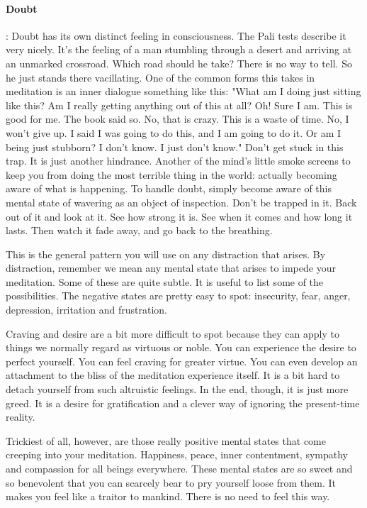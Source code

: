 \paragraph*{Doubt}: Doubt has its own distinct feeling in consciousness. The Pali tests
describe it very nicely. It's the feeling of a man stumbling through a desert
and arriving at an unmarked crossroad. Which road should he take? There is no
way to tell. So he just stands there vacillating. One of the common forms this
takes in meditation is an inner dialogue something like this: "What am I doing
just sitting like this? Am I really getting anything out of this at all? Oh!
Sure I am. This is good for me. The book said so. No, that is crazy. This is a
waste of time. No, I won't give up. I said I was going to do this, and I am
going to do it. Or am I being just stubborn? I don't know. I just don't know."
Don't get stuck in this trap. It is just another hindrance. Another of the
mind's little smoke screens to keep you from doing the most terrible thing in
the world: actually becoming aware of what is happening. To handle doubt, simply
become aware of this mental state of wavering as an object of inspection. Don't
be trapped in it. Back out of it and look at it. See how strong it is. See when
it comes and how long it lasts. Then watch it fade away, and go back to the
breathing.

This is the general pattern you will use on any distraction that arises. By
distraction, remember we mean any mental state that arises to impede your
meditation. Some of these are quite subtle. It is useful to list some of the
possibilities. The negative states are pretty easy to spot: insecurity, fear,
anger, depression, irritation and frustration.

Craving and desire are a bit more difficult to spot because they can apply to
things we normally regard as virtuous or noble. You can experience the desire to
perfect yourself. You can feel craving for greater virtue. You can even develop
an attachment to the bliss of the meditation experience itself. It is a bit hard
to detach yourself from such altruistic feelings. In the end, though, it is just
more greed. It is a desire for gratification and a clever way of ignoring the
present-time reality.

Trickiest of all, however, are those really positive mental states that come creeping into your meditation. Happiness, peace, inner
contentment, sympathy and compassion for all beings everywhere. These mental states are so sweet and so benevolent that you
can scarcely bear to pry yourself loose from them. It makes you feel like a traitor to mankind. There is no need to feel this way.

